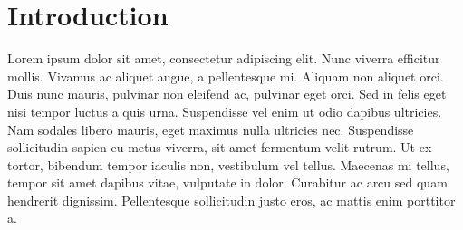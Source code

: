 

\section{Introduction}
\label{sec:introduction}

Lorem ipsum dolor sit amet, consectetur adipiscing elit. Nunc viverra efficitur mollis. Vivamus ac aliquet augue, a pellentesque mi. Aliquam non aliquet orci. Duis nunc mauris, pulvinar non eleifend ac, pulvinar eget orci. Sed in felis eget nisi tempor luctus a quis urna. Suspendisse vel enim ut odio dapibus ultricies. Nam sodales libero mauris, eget maximus nulla ultricies nec. Suspendisse sollicitudin sapien eu metus viverra, sit amet fermentum velit rutrum. Ut ex tortor, bibendum tempor iaculis non, vestibulum vel tellus. Maecenas mi tellus, tempor sit amet dapibus vitae, vulputate in dolor. Curabitur ac arcu sed quam hendrerit dignissim. Pellentesque sollicitudin justo eros, ac mattis enim porttitor a.



